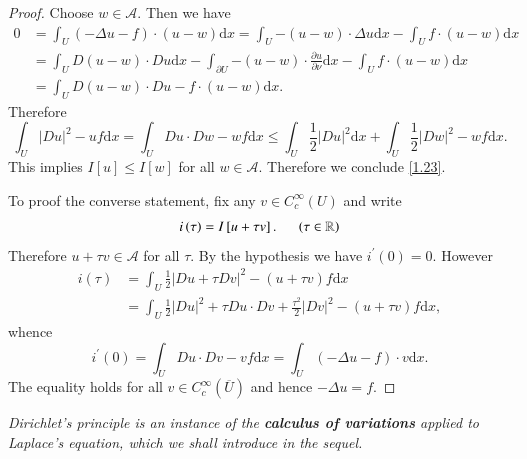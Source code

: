 \begin{proof}
Choose $w\in\mathcal{A}$. Then we have 
$$
\begin{aligned}
0&=\int_U{\left( -\Delta u-f \right) \cdot \left( u-w \right) \mathrm{d}x}=\int_U{-\left( u-w \right) \cdot \Delta u\mathrm{d}x}-\int_U{f\cdot \left( u-w \right) \mathrm{d}x}
\\
&=\int_U{D\left( u-w \right) \cdot Du\mathrm{d}x}-\int_{\partial U}{-\left( u-w \right) \cdot \frac{\partial u}{\partial \nu}\mathrm{d}x}-\int_U{f\cdot \left( u-w \right) \mathrm{d}x}
\\
&=\int_U{D\left( u-w \right) \cdot Du-f\cdot \left( u-w \right) \mathrm{d}x}.
\end{aligned}
$$
Therefore 
$$
\int_U{\left| Du \right|^2-uf\mathrm{d}x}=\int_U{Du\cdot Dw-wf\mathrm{d}x}\le \int_U{\frac{1}{2}\left| Du \right|^2\mathrm{d}x}+\int_U{\frac{1}{2}\left| Dw \right|^2-wf\mathrm{d}x}.
$$
This implies $I[u]\le I[w]$ for all $w\in\mathcal{A}$. Therefore we conclude \eqref{1.23}.\par
To proof the converse statement, fix any $v\in C_c^\infty(U)$ and write 
$$
i\left( \tau \right) =I\left[ u+\tau v \right] .\hspace{0.5cm}\left( \tau \in \mathbb{R} \right) 
$$
Therefore $u+\tau v\in\mathcal{A}$ for all $\tau$. By the hypothesis we have $i^\prime(0)=0$. However 
$$
\begin{aligned}
i\left( \tau \right) &=\int_U{\frac{1}{2}\left| Du+\tau Dv \right|^2-\left( u+\tau v \right) f\mathrm{d}x}
\\
&=\int_U{\frac{1}{2}\left| Du \right|^2+\tau Du\cdot Dv+\frac{\tau ^2}{2}\left| Dv \right|^2-\left( u+\tau v \right) f\mathrm{d}x},
\end{aligned}
$$
whence 
$$
i^{\prime}\left( 0 \right) =\int_U{Du\cdot Dv-vf\mathrm{d}x}=\int_U{\left( -\Delta u-f \right) \cdot v\mathrm{d}x}.
$$
The equality holds for all $v\in C_c^\infty(\overline{U})$ and hence $-\Delta u=f$.
\end{proof}
\begin{note}\em
Dirichlet's principle is an instance of the \textbf{calculus of variations} applied to Laplace's equation, which we shall introduce in the sequel.
\end{note}
